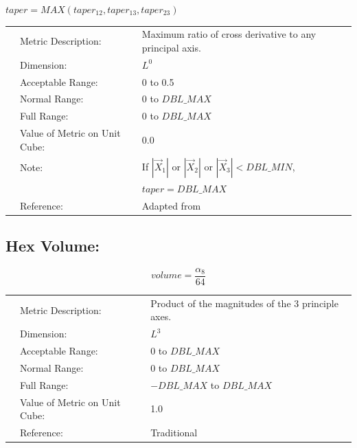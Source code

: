 \documentclass[12pt]{article}
\begin{document}
\begin{center}
$taper = MAX\left( taper_{12}, taper_{13}, taper_{23} \right)$
\end{center}

\begin{tabular}{lll}
& Metric Description:  & Maximum ratio of cross derivative to any principal axis. \\ 
& Dimension:           & $L^0$                              \\ 
& Acceptable Range:    & 0 to 0.5                      \\ 
& Normal Range:        & 0 to $DBL\_MAX$                       \\ 
& Full Range:          & 0 to $DBL\_MAX$ \\ 
& Value of Metric on Unit Cube:    & 0.0 \\
& Note:                & If $|\vec X_1 |$ or $|\vec X_2 |$ or $|\vec X_3| < DBL\_MIN$,\\ 
&                      & $taper = DBL\_MAX$ \\
& Reference:           & Adapted from \cite{one} \\
\end{tabular} 


\subsection*{Hex Volume:}

\begin{displaymath}
volume = \frac {\alpha_8 } {64}
\end{displaymath}


\begin{tabular}{lll}
& Metric Description:  & Product of the magnitudes of the 3 principle axes. \\ 
& Dimension:           & $L^3$                              \\ 
& Acceptable Range:    & 0 to $DBL\_MAX$                       \\ 
& Normal Range:        & 0 to $DBL\_MAX$                       \\ 
& Full Range:          & $-DBL\_MAX$ to $DBL\_MAX$ \\ 
& Value of Metric on Unit Cube:    & 1.0 \\
& Reference:           & Traditional \\
\end{tabular} 
\end{document}

